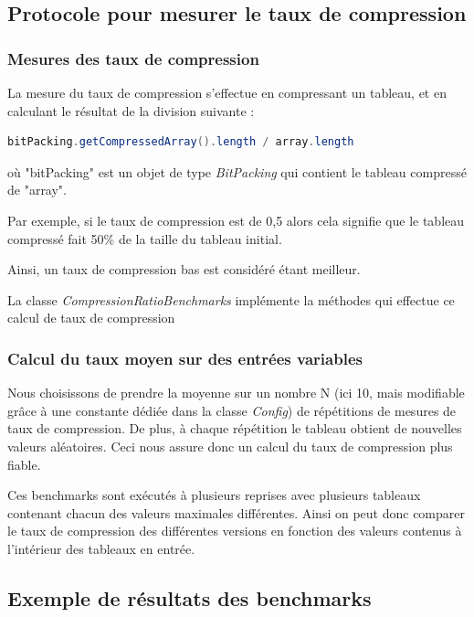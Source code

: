 \documentclass[titlepage]{article}
\begin{document}
\subsection{Protocole pour mesurer le taux de compression}

\subsubsection{Mesures des taux de compression}

La mesure du taux de compression s'effectue en compressant un tableau, et en calculant le résultat  de la division suivante :
\begin{lstlisting}[language=Java] 
bitPacking.getCompressedArray().length / array.length
\end{lstlisting} 
où "bitPacking" est un objet de type \textsl{BitPacking} qui contient le tableau compressé de "array".
\par Par exemple, si le taux de compression est de 0,5 alors cela signifie que le tableau compressé fait 50\% de la taille du tableau initial.
\par Ainsi, un taux de compression bas est considéré étant meilleur.
\par La classe \textsl{CompressionRatioBenchmarks} implémente la méthodes qui effectue ce calcul de taux de compression

\subsubsection{Calcul du taux moyen sur des entrées variables}

Nous choisissons de prendre la moyenne sur un nombre N (ici 10, mais modifiable grâce à une constante dédiée dans la classe \textsl{Config}) de répétitions de mesures de taux de compression. De plus, à chaque répétition le tableau obtient de nouvelles valeurs aléatoires. Ceci nous assure donc un calcul du taux de compression plus fiable.
\par Ces benchmarks sont exécutés à plusieurs reprises avec plusieurs tableaux contenant chacun des valeurs maximales différentes. Ainsi on peut donc comparer le taux de compression des différentes versions en fonction des valeurs contenus à l'intérieur des tableaux en entrée.

\subsection{Exemple de résultats des benchmarks}
\end{document}
